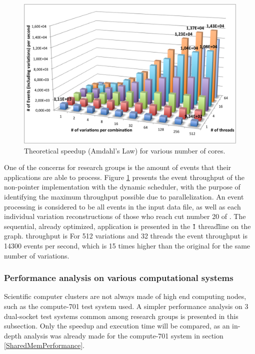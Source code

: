 \begin{figure}[!htp]
	\begin{center}
		\includegraphics[scale=0.6]{../../common/graphs/throughput.png}
		\caption{Theoretical speedup (Amdahl's Law) for various number of cores.}
		\label{fig:EventThroughput}
	\end{center}
\end{figure}

One of the concerns for research groups is the amount of events that their applications are able to process. Figure \ref{fig:EventThroughput} presents the event throughput of the non-pointer implementation with the dynamic scheduler, with the purpose of identifying the maximum throughput possible due to parallelization. An event processing is considered to be all events in the input data file, as well as each individual variation reconstructions of those who reach cut number 20 of \tth. The sequential, already optimized, application is presented in the \"1 thread\" line on the graph. throughput is For 512 variations and 32 threads the event throughput is 14300 events per second, which is 15 times higher than the original for the same number of variations.


\subsubsection{Performance analysis on various computational systems}
\label{SharedMemPerformanceVarious}

Scientific computer clusters are not always made of high end computing nodes, such as the compute-701 test system used. A simpler performance analysis on 3 dual-socket test systems common among research groups is presented in this subsection. Only the speedup and execution time will be compared, as an in-depth analysis was already made for the compute-701 system in section \ref{SharedMemPerformance}.

